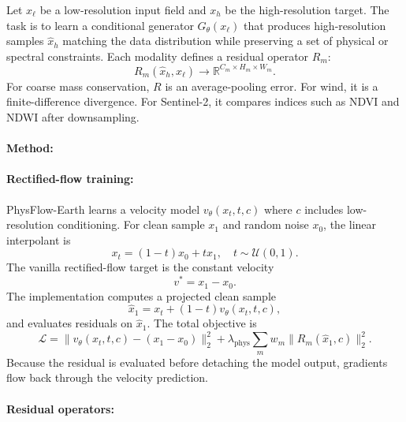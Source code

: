 \documentclass{article}
\begin{document}
Let $x_{\ell}$ be a low-resolution input field and $x_h$ be the high-resolution target. The task is to learn a conditional generator $G_{\theta}(x_{\ell})$ that produces high-resolution samples $\hat{x}_h$ matching the data distribution while preserving a set of physical or spectral constraints. Each modality defines a residual operator $R_m$:
\begin{equation}
  R_m(\hat{x}_h, x_{\ell}) \rightarrow \mathbb{R}^{C_m \times H_m \times W_m}.
\end{equation}
For coarse mass conservation, $R$ is an average-pooling error. For wind, it is a finite-difference divergence. For Sentinel-2, it compares indices such as NDVI and NDWI after downsampling.

\paragraph{Method:}

\paragraph{Rectified-flow training:}

PhysFlow-Earth learns a velocity model $v_{\theta}(x_t,t,c)$ where $c$ includes low-resolution conditioning. For clean sample $x_1$ and random noise $x_0$, the linear interpolant is
\begin{equation}
  x_t = (1-t)x_0 + tx_1, \quad t\sim \mathcal{U}(0,1).
\end{equation}
The vanilla rectified-flow target is the constant velocity
\begin{equation}
  v^* = x_1 - x_0.
\end{equation}
The implementation computes a projected clean sample
\begin{equation}
  \hat{x}_1 = x_t + (1-t)v_{\theta}(x_t,t,c),
\end{equation}
and evaluates residuals on $\hat{x}_1$. The total objective is
\begin{equation}
  \mathcal{L} =
  \|v_{\theta}(x_t,t,c)-(x_1-x_0)\|_2^2
  + \lambda_{\text{phys}}\sum_m w_m \|R_m(\hat{x}_1,c)\|_2^2.
\end{equation}
Because the residual is evaluated before detaching the model output, gradients flow back through the velocity prediction.

\paragraph{Residual operators:}
\end{document}
